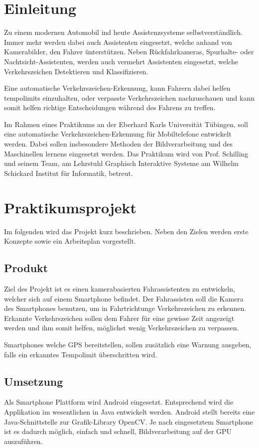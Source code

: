 \setlength{\parskip}{0.5em}
\section*{Einleitung}
    Zu einem modernen Automobil ind heute Assistenzsysteme selbstverständlich. Immer mehr werden dabei auch Assistenten eingesetzt, welche anhand von Kamerabilder, den Fahrer ünterstützen.
    Neben Rückfahrkameras, Spurhalte- oder Nachtsicht-Assistenten, werden auch vermehrt Assistenten eingesetzt, welche Verkehrszeichen Detektieren und Klassifizieren.

    Eine automatische Verkehrszeichen-Erkennung, kann Fahrern dabei helfen tempolimits einzuhalten, oder verpasste Verkehrszeichen nachzuschauen und kann somit helfen richtige Entscheidungen
    während des Fahrens zu treffen.

    Im Rahmen eines Praktikums an der Eberhard Karls Universität Tübingen, soll eine automatische Verkehrszeichen-Erkennung für Mobiltelefone entwickelt werden. Dabei sollen insbesondere
    Methoden der Bildverarbeitung und des Maschinellen lernens eingesetzt werden. Das Praktikum wird von Prof. Schilling und seinem Team, am Lehrstuhl Graphisch Interaktive Systeme am 
    Wilhelm Schickard Institut für Informatik, betreut.
\section*{Praktikumsprojekt}
    Im folgenden wird das Projekt kurz beschrieben. Neben den Zielen werden erste Konzepte sowie ein Arbeitsplan vorgestellt.
\subsection*{Produkt}
    Ziel des Projekt ist es einen kamerabasierten Fahrassistenten zu entwickeln, welcher sich auf einem Smartphone befindet. Der Fahrassisten soll die Kamera des Smartphones benutzen,
    um in Fahrtrichtunge Verkehrszeichen zu erkennen. Erkannte Verkehrszeichen sollen dem Fahrer für eine gewisse Zeit angezeigt werden und ihm somit helfen, möglichst wenig Verkehrszeichen zu
    verpassen.

    Smartphones welche GPS bereitstellen, sollen zusätzlich eine Warnung ausgeben, falls ein erkanntes Tempolimit überschritten wird.
\subsection*{Umsetzung}
    Als Smartphone Plattform wird Android eingesetzt. Entsprechend wird die Applikation im wesentlichen in Java entwickelt werden. Android stellt bereits eine Java-Schnittstelle zur Grafik-Library
    OpenCV. Je nach eingesetztem Smartphone ist es dadurch möglich, einfach und schnell, Bildverarbeitung auf der GPU auszuführen.

